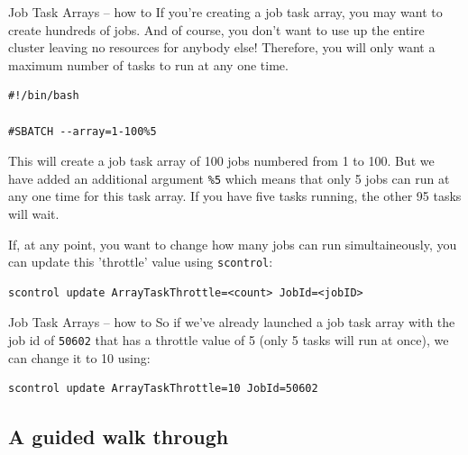 \documentclass[10pt]{beamer}
\begin{document}
\begin{frame}[label={sec:orgb5faa8c},fragile]{Job Task Arrays -- how to}
 If you're creating a job task array, you may want to create hundreds of
jobs. And of course, you don't want to use up the entire cluster leaving no
resources for anybody else! Therefore, you will only want a maximum number of
tasks to run at any one time.

\begin{verbatim}
#!/bin/bash

#SBATCH --array=1-100%5
\end{verbatim}

This will create a job task array of 100 jobs numbered from 1 to 100. But we
have added an additional argument \texttt{\%5} which means that only 5 jobs can run at any
one time for this task array. If you have five tasks running, the other 95 tasks
will wait.

If, at any point, you want to change how many jobs can run simultaineously, you
can update this 'throttle' value using \texttt{scontrol}:

\begin{verbatim}
scontrol update ArrayTaskThrottle=<count> JobId=<jobID>
\end{verbatim}
\end{frame}

\begin{frame}[label={sec:orga9b4f3c},fragile]{Job Task Arrays -- how to}
 So if we've already launched a job task array with the job id of \texttt{50602} that has
a throttle value of 5 (only 5 tasks will run at once), we can change it to 10
using:

\begin{verbatim}
scontrol update ArrayTaskThrottle=10 JobId=50602
\end{verbatim}
\end{frame}

\subsection{A guided walk through}
\label{sec:org4a5218d}
\end{document}
